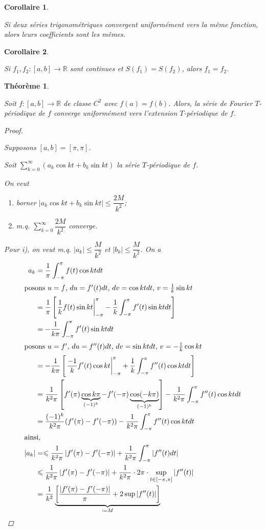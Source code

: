 \documentclass{report}
\newcommand*{\dsum}[4]{\displaystyle\sum_{#1=#2}^{#3}#4}
\newcommand*{\dint}[3]{\displaystyle\int_{#1}^{#2}#3}
\newcommand*{\abs}[1]{\left| #1 \right|}
\newcommand*{\lte}{\leqslant}
\newcommand*{\reels}{\mathbb{R}}
\newtheorem*{thm}{Th\'eor\`eme}
\newtheorem*{coro}{Corollaire}
\theoremstyle{definition}
\theoremstyle{remark}
\begin{document}
	\begin{coro}~

		Si deux s\'eries trigonom\'etriques convergent uniform\'ement vers la m\^eme fonction, alors leurs coefficients sont les m\^emes.
	\end{coro}
	\begin{coro}~

		Si $f_1,f_2:[a,b] \to \reels$ sont continues et $S(f_1) = S(f_2)$, alors $f_1=f_2$.
	\end{coro}
	\begin{thm}~

		Soit $f:[a,b] \to \reels$ de classe $C^2$ avec $f(a)=f(b)$. Alors, la s\'erie de Fourier $T$-p\'eriodique de $f$ converge uniform\'ement vers l'extension $T$-p\'eriodique de $f$.
		\begin{proof}~

			Supposons $[a,b]=[\pi,\pi]$.

			Soit $\dsum{k}{0}{\infty}{\left(a_k\cos kt + b_k\sin kt\right)}$ la s\'erie $T$-p\'eriodique de $f$.

			On veut
			\begin{enumerate}[label=\roman*)]
				\item borner $\abs{a_k\cos kt+b_k\sin kt} \lte \dfrac{2M}{k^2}$;
				\item m.q. $\dsum{k}{0}{\infty}{\dfrac{2M}{k^2}}$ converge.
			\end{enumerate}

			Pour i), on veut m.q. $\abs{a_k} \lte \dfrac{M}{k^2}$ et $\abs{b_k} \lte \dfrac{M}{k^2}$. On a
			\begin{align*}
				a_k&= \dfrac{1}{\pi} \dint{-\pi}{\pi}{f(t) \cos kt dt}\\
				\shortintertext{posons $u=f$, $du=f'(t)dt$, $dv=\cos kt dt$, $v=\frac{1}{k}\sin kt$}
				&= \dfrac{1}{\pi} \left[ \left. \dfrac{1}{k} f(t) \sin kt \right|_{-\pi}^{\pi} - \dfrac{1}{k} \dint{-\pi}{\pi}{f'(t) \sin kt dt} \right]\\
				&= -\dfrac{1}{k\pi} \dint{-\pi}{\pi}{f'(t) \sin kt dt}\\
				\shortintertext{posons $u=f'$, $du=f''(t)dt$, $dv=\sin kt dt$, $v=-\frac{1}{k} \cos kt$}
				&= -\dfrac{1}{k\pi} \left[ \left. \dfrac{-1}{k} f'(t) \cos kt \right|_{-\pi}^{\pi} + \dfrac{1}{k} \dint{-\pi}{\pi}{f''(t) \cos kt dt} \right]\\
				&= \dfrac{1}{k^2\pi} \left[ f'(\pi) \underbrace{\cos k\pi}_{(-1)^k} - f'(-\pi) \underbrace{\cos(-k\pi)}_{(-1)^k} \right] - \dfrac{1}{k^2\pi} \dint{-\pi}{\pi}{f''(t) \cos kt dt}\\
				&= \dfrac{(-1)^k}{k^2\pi} (f'(\pi)-f'(-\pi)) - \dfrac{1}{k^2\pi} \dint{-\pi}{\pi}{f''(t) \cos kt dt}\\
				\intertext{ainsi,}
				\abs{a_k}&=\lte \dfrac{1}{k^2\pi} \abs{f'(\pi)-f'(-\pi)} + \dfrac{1}{k^2\pi} \dint{-\pi}{\pi}{\abs{f''(t) dt}}\\
				&\lte \dfrac{1}{k^2\pi} \abs{f'(\pi)-f'(-\pi)} + \dfrac{1}{k^2\pi} \cdot 2\pi \cdot \sup\limits_{t \in [-\pi,\pi]}\abs{f''(t)}\\
				&= \dfrac{1}{k^2} \underbrace{\left[ \dfrac{\abs{f'(\pi)-f'(-\pi)}}{\pi} + 2 \sup \abs{f''(t)} \right]}_{\coloneq M}
			\end{align*}


\end{proof}
\end{thm}
\end{document}
